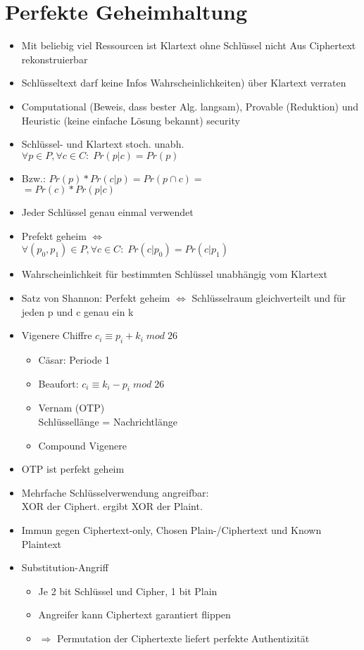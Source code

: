 \documentclass[11pt, paper=a4, twocolumn]{scrartcl}
\begin{document}
	\section{Perfekte Geheimhaltung}
		\begin{itemize}
			\item Mit beliebig viel Ressourcen ist Klartext ohne Schlüssel nicht Aus Ciphertext rekonstruierbar
			\item Schlüsseltext darf keine Infos Wahrscheinlichkeiten) über Klartext verraten
			\item Computational (Beweis, dass bester Alg. langsam), Provable (Reduktion) und Heuristic (keine einfache Lösung bekannt) security
			\item Schlüssel- und Klartext stoch. unabh.\\
				$\forall p\in P, \forall c\in C:\;Pr(p|c)=Pr(p)$
			\item Bzw.: $Pr(p)*Pr(c|p)=Pr(p\cap c)=$\\
				$=Pr(c)*Pr(p|c)$
			\item Jeder Schlüssel genau einmal verwendet
			\item Prefekt geheim $\Leftrightarrow$\\
				$\forall (p_0,p_1)\in P, \forall c\in C:\;Pr(c|p_0)=Pr(c|p_1)$
			\item Wahrscheinlichkeit für bestimmten Schlüssel unabhängig vom Klartext
			\item Satz von Shannon: Perfekt geheim $\Leftrightarrow$ Schlüsselraum gleichverteilt und für jeden p und c genau ein k
			\item Vigenere Chiffre $c_i \equiv p_i+k_i\;mod\;26$
				\begin{itemize}
					\item Cäsar: Periode 1
					\item Beaufort: $c_i\equiv k_i-p_i\;mod\;26$
					\item Vernam (OTP)\\
						Schlüssellänge = Nachrichtlänge
					\item Compound Vigenere
				\end{itemize}
			\item OTP ist perfekt geheim
			\item Mehrfache Schlüsselverwendung angreifbar:\\
				XOR der Ciphert. ergibt XOR der Plaint.
			\item Immun gegen Ciphertext-only, Chosen Plain-/Ciphertext und Known Plaintext
			\item Substitution-Angriff
				\begin{itemize}
					\item Je 2 bit Schlüssel und Cipher, 1 bit Plain
					\item Angreifer kann Ciphertext garantiert flippen
					\item $\Rightarrow$ Permutation der Ciphertexte liefert perfekte Authentizität
				\end{itemize}
		\end{itemize}
	
\end{document}
